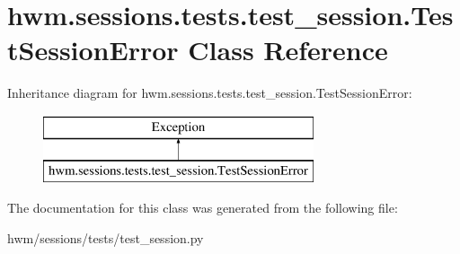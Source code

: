 \hypertarget{classhwm_1_1sessions_1_1tests_1_1test__session_1_1_test_session_error}{\section{hwm.\-sessions.\-tests.\-test\-\_\-session.\-Test\-Session\-Error Class Reference}
\label{classhwm_1_1sessions_1_1tests_1_1test__session_1_1_test_session_error}
}
Inheritance diagram for hwm.\-sessions.\-tests.\-test\-\_\-session.\-Test\-Session\-Error\-:\begin{figure}[H]
\begin{center}
\leavevmode
\includegraphics[height=2.000000cm]{classhwm_1_1sessions_1_1tests_1_1test__session_1_1_test_session_error}
\end{center}
\end{figure}


The documentation for this class was generated from the following file\-:\begin{DoxyCompactItemize}
\item 
hwm/sessions/tests/test\-\_\-session.\-py\end{DoxyCompactItemize}
